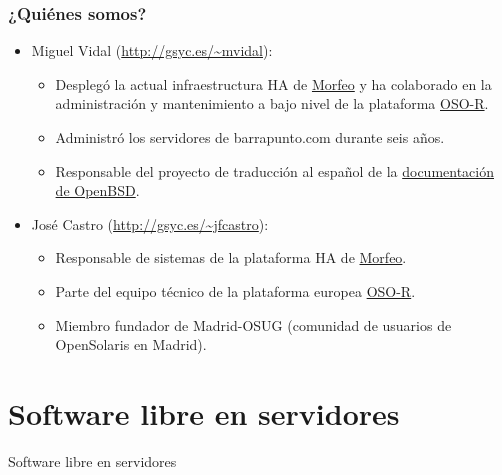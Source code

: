 \documentclass{beamer}
\begin{document}
\begin{frame}
\frametitle{¿Quiénes somos?}

\begin{itemize}
\item \alert{Miguel Vidal} (\url{http://gsyc.es/~mvidal}): 


	\begin{itemize}

\footnotesize

	\item Desplegó la actual infraestructura HA de \href{http://www.morfeo-project.org}{Morfeo} y ha colaborado en la administración y mantenimiento a bajo nivel de la plataforma \href{http://www.osor.eu}{OSO-R}. 
	\item Administró los servidores de barrapunto.com durante seis años.
	\item Responsable del proyecto de traducción al español de la \href{http://www.openbsd.org/translation.html\#WHO}{documentación de OpenBSD}.
	\end{itemize}

\normalsize

\item \alert{José Castro} (\url{http://gsyc.es/~jfcastro}): 

	\begin{itemize}

\footnotesize

	\item Responsable de sistemas de la plataforma HA de \href{http://www.morfeo-project.org}{Morfeo}. 
	\item Parte del equipo técnico de la plataforma europea \href{http://www.osor.eu}{OSO-R}.
	\item Miembro fundador de Madrid-OSUG (comunidad de usuarios de OpenSolaris en Madrid).
	\end{itemize}

\end{itemize}
\end{frame}

\normalsize


\section{Software libre en servidores}

\begin{frame}

\begin{center}
\huge{Software libre en servidores}
\end{center}

\end{frame}
\end{document}
